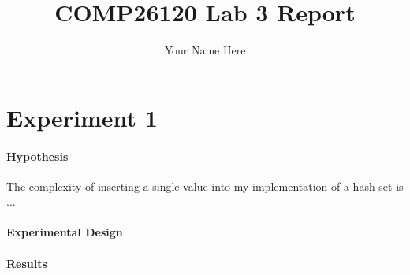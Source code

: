 \documentclass[a4]{article}
\title{COMP26120 Lab 3 Report}
\author{Your Name Here}
\begin{document}
\maketitle

\section{Experiment 1}


\paragraph{Hypothesis} The complexity of inserting a single value into my implementation of a hash set is ...


\paragraph{Experimental Design} 









\paragraph{Results} 


\end{document}
